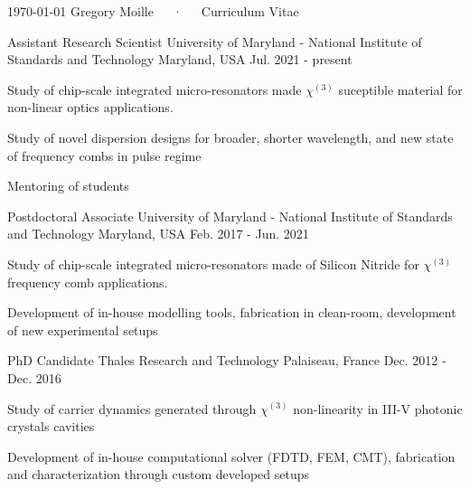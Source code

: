 \documentclass[11pt, letterpaper]{customcv}
\begin{document}
\makecvheader
\makecvfooter
  {\today}
  {Gregory Moille~~~·~~~Curriculum Vitae}
  {\thepage}

%
{%
}
%
{
    \cventry%
        {Assistant Research Scientist} %
        {University of Maryland - National Institute of Standards and Technology} %
        {Maryland, USA} %
        {Jul. 2021 - present} %
        {
          \begin{cvitems} %
            \item {Study of chip-scale integrated micro-resonators made $\chi^{(3)}$ suceptible material for non-linear optics applications.}
            \item{Study of novel dispersion designs for broader, shorter wavelength, and new state of frequency combs in pulse regime}
            \item{Mentoring of students}
          \end{cvitems}
        }
    \cventry%
        {Postdoctoral Associate} %
        {University of Maryland - National Institute of Standards and Technology} %
        {Maryland, USA} %
        {Feb. 2017 - Jun. 2021} %
        {
          \begin{cvitems} %
            \item {Study of chip-scale integrated micro-resonators made of Silicon Nitride for $\chi^{(3)}$ frequency comb applications.}
            \item{Development of in-house modelling tools, fabrication in clean-room, development of new experimental setups}
          \end{cvitems}
        }
    \cventry
        {PhD Candidate} %
        {Thales Research and Technology} %
        {Palaiseau, France} %
        {Dec. 2012 - Dec. 2016} %
        {
          \begin{cvitems} %
            \item {Study of carrier dynamics generated through $\chi^{(3)}$ non-linearity in III-V photonic crystals cavities}
            \item {Development of in-house computational solver (FDTD, FEM, CMT), fabrication and characterization through custom developed setups}
          \end{cvitems}
        }
}%
\end{document}
